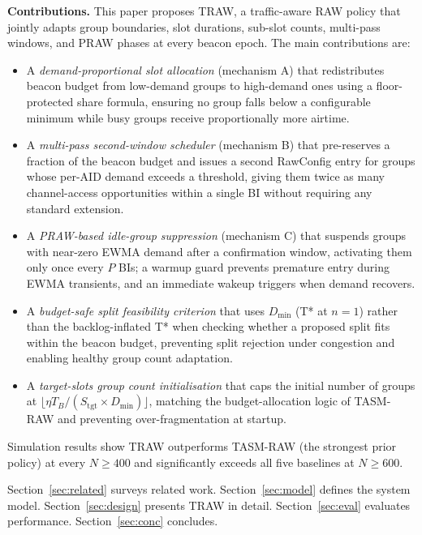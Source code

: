 \documentclass[conference]{IEEEtran}
\begin{document}
\textbf{Contributions.}
This paper proposes TRAW, a traffic-aware RAW policy that jointly adapts
group boundaries, slot durations, sub-slot counts, multi-pass windows,
and PRAW phases at every beacon epoch.
The main contributions are:
\begin{itemize}
  \item A \emph{demand-proportional slot allocation} (mechanism A) that
        redistributes beacon budget from low-demand groups to high-demand
        ones using a floor-protected share formula, ensuring no group
        falls below a configurable minimum while busy groups receive
        proportionally more airtime.
  \item A \emph{multi-pass second-window scheduler} (mechanism B) that
        pre-reserves a fraction of the beacon budget and issues a
        second RawConfig entry for groups whose per-AID demand exceeds
        a threshold, giving them twice as many channel-access
        opportunities within a single BI without requiring any
        standard extension.
  \item A \emph{PRAW-based idle-group suppression} (mechanism C) that
        suspends groups with near-zero EWMA demand after a confirmation
        window, activating them only once every $P$ BIs; a warmup guard
        prevents premature entry during EWMA transients, and an
        immediate wakeup triggers when demand recovers.
  \item A \emph{budget-safe split feasibility criterion} that uses
        $D_\mathrm{min}$ (T* at $n\!=\!1$) rather than the
        backlog-inflated T* when checking whether a proposed split fits
        within the beacon budget, preventing split rejection under
        congestion and enabling healthy group count adaptation.
  \item A \emph{target-slots group count initialisation} that caps the
        initial number of groups at $\lfloor\eta T_B / (S_\mathrm{tgt}
        \times D_\mathrm{min})\rfloor$, matching the budget-allocation
        logic of TASM-RAW and preventing over-fragmentation at startup.
\end{itemize}

Simulation results show TRAW outperforms TASM-RAW (the strongest prior
policy) at every $N\!\geq\!400$ and significantly exceeds all five
baselines at $N\!\geq\!600$.

Section~\ref{sec:related} surveys related work.
Section~\ref{sec:model} defines the system model.
Section~\ref{sec:design} presents TRAW in detail.
Section~\ref{sec:eval} evaluates performance.
Section~\ref{sec:conc} concludes.
\end{document}
